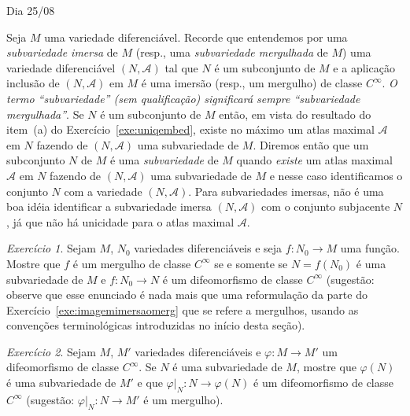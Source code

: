 \documentclass[oneside,11pt]{amsart}
\theoremstyle{remark}\newtheorem{exercise}{Exercício}[section]
\theoremstyle{plain}\newtheorem{teo}{Teorema}[section]
\theoremstyle{plain}\newtheorem{lem}[teo]{Lema}
\theoremstyle{plain}\newtheorem{prop}[teo]{Proposição}
\theoremstyle{definition}\newtheorem{defin}[teo]{Definição}
\theoremstyle{remark}\newtheorem{rem}[teo]{Observação}
\theoremstyle{definition}\newtheorem{example}[teo]{Exemplo}
\numberwithin{equation}{section}
\begin{document}
\begin{section}{Dia 25/08}

Seja $M$ uma variedade diferenciável. Recorde que entendemos por uma {\em subvariedade imersa\/} de $M$ (resp., uma {\em subvariedade mergulhada\/} de $M$)
uma variedade diferenciável $(N,\mathcal A)$ tal que $N$ é um subconjunto de $M$ e a aplicação inclusão de $(N,\mathcal A)$ em $M$ é uma imersão (resp.,
um mergulho) de classe $C^\infty$. {\em O termo ``subvariedade'' (sem qualificação) significará sempre ``subvariedade mergulhada''}.
Se $N$ é um subconjunto de $M$ então, em vista do resultado do item~(a) do Exercício~\ref{exe:uniqembed}, existe no máximo
um atlas maximal $\mathcal A$ em $N$ fazendo de $(N,\mathcal A)$ uma subvariedade de $M$. Diremos então que um subconjunto $N$ de $M$ é uma {\em subvariedade\/}
de $M$ quando {\em existe\/} um atlas maximal $\mathcal A$ em $N$ fazendo de $(N,\mathcal A)$ uma subvariedade de $M$ e nesse caso
identificamos o conjunto $N$ com a variedade $(N,\mathcal A)$.
Para subvariedades imersas, não é uma boa idéia identificar a subvariedade imersa $(N,\mathcal A)$ com o conjunto subjacente $N$, já que não há unicidade
para o atlas maximal $\mathcal A$.

\begin{exercise}\label{exe:mergrestated}
Sejam $M$, $N_0$ variedades diferenciáveis e seja $f:N_0\to M$ uma função. Mostre que $f$ é um mergulho de classe $C^\infty$
se e somente se $N=f(N_0)$ é uma subvariedade de $M$ e $f:N_0\to N$ é um difeomorfismo de classe $C^\infty$ (sugestão:
observe que esse enunciado é nada mais que uma reformulação da parte do Exercício~\ref{exe:imagemimersaomerg} que se refere a mergulhos,
usando as convenções terminológicas introduzidas no início desta seção).
\end{exercise}

\begin{exercise}\label{exe:difeosubvar}
Sejam $M$, $M'$ variedades diferenciáveis e $\varphi:M\to M'$ um difeomorfismo de classe $C^\infty$. Se $N$ é uma subvariedade de $M$, mostre
que $\varphi(N)$ é uma subvariedade de $M'$ e que $\varphi\vert_N:N\to\varphi(N)$ é um difeomorfismo de classe $C^\infty$
(sugestão: $\varphi\vert_N:N\to M'$ é um mergulho).
\end{exercise}


\end{section}
\end{document}
